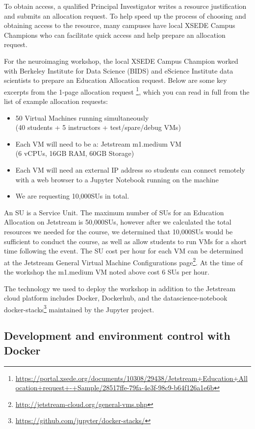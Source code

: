 To obtain access, a qualified Principal Investigator writes a resource
justification and submits an allocation request. To help speed up the
process of choosing and obtaining access to the resource, many campuses
have local XSEDE Campus Champions who can facilitate quick access and
help prepare an allocation request.

For the neuroimaging workshop, the local XSEDE Campus Champion worked with Berkeley
Institute for Data Science (BIDS) and eScience Institute data scientists to
prepare an Education Allocation request. Below are some key excerpts from the
1-page allocation request \footnote{\url{https://portal.xsede.org/documents/10308/29438/Jetstream+Education+Allocation+request+-+Sample/28517ffe-79fa-4e3f-98c9-b64f126a1e6b}},
which you can read in full from the list of example allocation requests:

\begin{itemize}
\item 50 Virtual Machines running simultaneously \\(40 students + 5 instructors +
test/spare/debug VMs)
\item Each VM will need to be a: Jetstream m1.medium VM \\(6 vCPUs, 16GB RAM, 60GB
  Storage)
\item Each VM will need an external IP address so students can connect remotely
  with a web browser to a Jupyter Notebook running on the machine
\item We are requesting 10,000SUs in total.
\end{itemize}

An SU is a Service Unit. The maximum number of SUs for an Education Allocation
on Jetstream is 50,000SUs, however after we calculated the total resources we
needed for the course, we determined that 10,000SUs would be sufficient to
conduct the course, as well as allow students to run VMs for a short time
following the event. The SU cost per hour for each VM can be determined at the
Jetstream General Virtual Machine Configurations page\footnote{\url{http://jetstream-cloud.org/general-vms.php}}.
At the time of the workshop the m1.medium VM noted above cost 6 SUs per hour.

The technology we used to deploy the workshop in addition to the Jetstream cloud
platform includes Docker, Dockerhub, and the datascience-notebook docker-stacks\footnote{\url{https://github.com/jupyter/docker-stacks/}}
maintained by the Jupyter project.

\subsection{Development and environment control with Docker}

